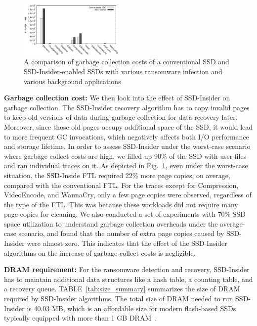 \documentclass[conference]{IEEEtran}
\newcommand{\ours}{SSD-Insider}
\begin{document}
\begin{figure}[t] 
	\centering 
	\includegraphics[width=0.45\textwidth]{exp/gc-high/fig}
	\caption{A comparison of garbage collection costs of
	a conventional SSD and \ours{}-enabled SSDs with various ransomware infection and various background applications} 
	\label{fig:flash-gc-cost} 
\end{figure}

{\bf Garbage collection cost:}
We then look into the effect of \ours{} on garbage collection.  The
\ours{} recovery algorithm has to copy invalid pages to keep old
versions of data during garbage collection for data recovery later.
Moreover, since those old pages occupy additional space of the SSD,
it would lead to more frequent GC invocations, which negatively
affects both I/O performance and storage lifetime.  In order to
assess \ours{} under the worst-case scenario where garbage collect
costs are high, we filled up 90\% of the SSD with user files and
ran individual traces on it. As depicted in
Fig.~\ref{fig:flash-gc-cost}, even under the worst-case situation,
the SSD-Inside FTL required 22\% more page copies, on average,
compared with the conventional FTL. For the traces except for
Compression, VideoEncode, and WannaCry, only a few
page copies were observed, regardless of the type of the FTL. This
was because these workloads did not require many page
copies for cleaning.  We also conducted a set of experiments with
70\% SSD  space utilization to understand garbage collection overheads
under the average-case scenario, and found that the number of extra
page copies caused by SSD-Insider were almost zero. This
indicates that the effect of the \ours{} algorithms on the increase
of garbage collect costs is negligible.

{\bf DRAM requirement:}
For the ransomware detection and recovery, \ours{} has to maintain additional
data structures like a hash table, a counting table, and a recovery queue.
TABLE~\ref{tab:size_summary} summarizes the size of DRAM required by \ours{}
algorithms. The total size of DRAM needed to run \ours{} is 40.03 MB, which is
an affordable size for modern flash-based SSDs typically equipped with more
than 1 GB DRAM~\cite{hitachi-ssd, samsung-ssd, phison-ssd}.
\end{document}
